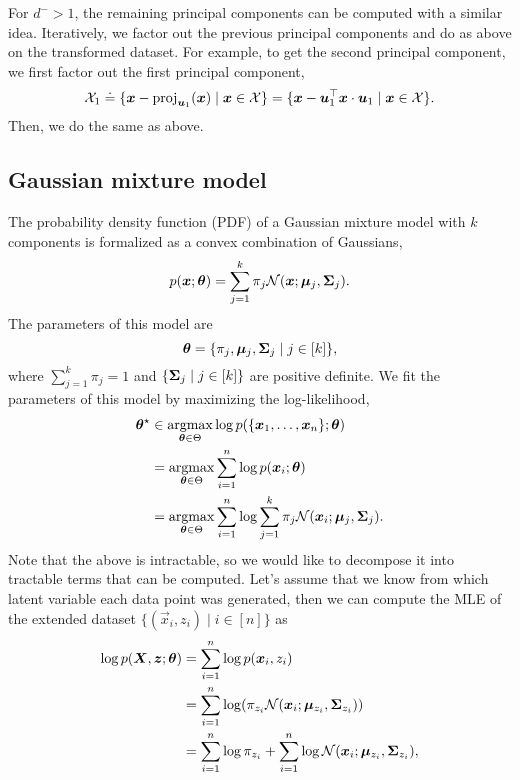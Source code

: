For $d^- > 1$, the remaining principal components can be computed with a similar idea. Iteratively,
we factor out the previous principal components and do as above on the transformed dataset. For
example, to get the second principal component, we first factor out the first principal component, \[
    \mathcal{X}_1 \doteq \{ \bm{x} - \mathrm{proj}_{\bm{u}_1}(\bm{x}) \mid \bm{x} \in \mathcal{X} \} = \{ \bm{x} - \bm{u}_1^\top \bm{x} \cdot \bm{u}_1 \mid \bm{x} \in \mathcal{X} \} .
\]
Then, we do the same as above.

\subsection{Gaussian mixture model}

The probability density function (PDF) of a Gaussian mixture model with $k$ components is
formalized as a convex combination of Gaussians, \[
    p(\bm{x}; \bm{\theta}) = \sum_{j=1}^{k} \pi_j \mathcal{N}(\bm{x}; \bm{\mu}_j, \bm{\Sigma}_j).
\]
The parameters of this model are \[
    \bm{\theta} = \{ \pi_j, \bm{\mu}_j, \bm{\Sigma}_j \mid j \in [k] \},
\]
where $\sum_{j=1}^{k} \pi_j = 1$ and $\{ \bm{\Sigma}_j \mid j \in [k] \}$ are positive definite.
We fit the parameters of this model by maximizing the log-likelihood,
\begin{align*}
    \bm{\theta}^\star & \in \operatorname*{argmax}_{\bm{\theta} \in \Theta} \log p(\{ \bm{x}_1, \ldots, \bm{x}_n \}; \bm{\theta})                                    \\
                       & = \operatorname*{argmax}_{\bm{\theta} \in \Theta} \sum_{i=1}^{n} \log p(\bm{x}_i; \bm{\theta})                                                \\
                       & = \operatorname*{argmax}_{\bm{\theta} \in \Theta} \sum_{i=1}^{n} \log \sum_{j=1}^{k} \pi_j \mathcal{N}(\bm{x}_i; \bm{\mu}_j, \bm{\Sigma}_j).
\end{align*}
Note that the above is intractable, so we would like to decompose it into tractable terms that can be
computed. Let's assume that we know from which latent variable each data point was generated, then we
can compute the MLE of the extended dataset $\{ (\vec{x}_i, z_i) \mid i \in [n] \}$ as
\begin{align*}
    \log p(\mat{X}, \vec{z}; \vec{\theta}) & = \sum_{i=1}^{n} \log p(\vec{x}_i, z_i)                                                                            \\
                                           & = \sum_{i=1}^{n} \log \lft( \pi_{z_i} \mathcal{N}(\vec{x}_i; \vec{\mu}_{z_i}, \mat{\Sigma}_{z_i}) \rgt)            \\
                                           & = \sum_{i=1}^{n} \log \pi_{z_i} + \sum_{i=1}^{n} \log \mathcal{N}(\vec{x}_i; \vec{\mu}_{z_i}, \mat{\Sigma}_{z_i}),
\end{align*}
